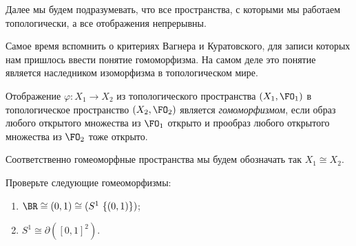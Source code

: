 	Далее мы будем подразумевать, что все пространства, с которыми мы работаем топологически, а все отображения непрерывны.

	Самое время вспомнить о критериях Вагнера и Куратовского, для записи которых нам пришлось ввести понятие гомоморфизма. На самом деле это понятие является наследником изоморфизма в топологическом мире.
	
\begin{definition}
	Отображение $\varphi \colon X_1 \to X_2$ из топологического пространства $(X_1, \FO_1)$ в топологическое пространство $(X_2, \FO_2)$ является \emph{гомоморфизмом}, если образ любого открытого множества из $\FO_1$ открыто и прообраз любого открытого множества из $\FO_2$ тоже открыто.
\end{definition}

	Соответственно гомеоморфные пространства мы будем обозначать так $X_1 \cong X_2$.
		
\begin{exersize}
	Проверьте следующие гомеоморфизмы:
	\begin{enumerate}
		\item $\BR \cong (0, 1) \cong (S^1 \ \lbrace(0,1)\rbrace)$;
		\item $S^1 \cong \partial([0,1]^2)$.
	\end{enumerate}
\end{exersize}
